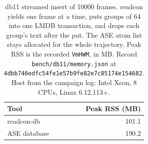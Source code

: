 \begin{table}[tbp]
\centering
\scriptsize
\caption{db11 streamed insert of 10000 frames.
readcon yields one frame at a time, puts groups of 64 into one LMDB transaction, and drops each group's text after the put.
The ASE atom list stays allocated for the whole trajectory.
Peak RSS is the recorded \texttt{VmHWM}, in MB.
Record \texttt{bench/db11/memory.json} at \texttt{4dbb746edfc54fe1e57b9fe82e7c85174e154682}.
Host from the campaign log: Intel Xeon, 8 CPUs, Linux 6.12.113+.}
\label{tab:db11-memory}
\begin{tabular}{@{}lr@{}}
\toprule
Tool & Peak RSS (MB) \\
\midrule
readcon-db & 101.1 \\
ASE database & 190.2 \\
\bottomrule
\end{tabular}
\end{table}
